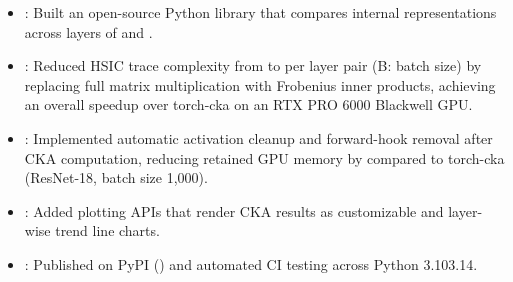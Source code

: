 \begin{itemize}
  \item {}: Built an open-source Python library that compares internal representations across layers of  and .
  \item {}: Reduced HSIC trace complexity from to per layer pair (B: batch size) by replacing full matrix multiplication with Frobenius inner products, achieving an overall \resumeEmphasis{8.1\ensuremath{\times}} speedup over torch-cka on an RTX PRO 6000 Blackwell GPU.
  \item {}: Implemented automatic activation cleanup and forward-hook removal after CKA computation, reducing retained GPU memory by  compared to torch-cka (ResNet-18, batch size 1,000).
  \item {}: Added plotting APIs that render CKA results as customizable  and layer-wise trend line charts.
  \item {}: Published on PyPI () and automated CI testing across Python 3.10\textendash{}3.14.
\end{itemize}
